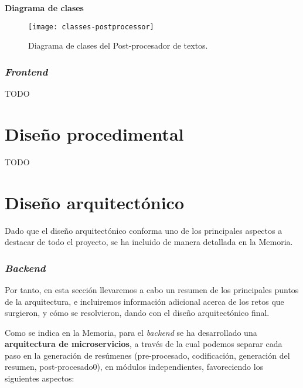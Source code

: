 \noindent
\textbf{Diagrama de clases}

\begin{figure}[h]
	\centering
	\texttt{[image: classes-postprocessor]}
	\vspace{-0.5cm}
	\caption{Diagrama de clases del Post-procesador de textos.}
\end{figure}


\subsubsection{\Large \emph{Frontend}}

TODO

\section{Diseño procedimental}

TODO

\section{Diseño arquitectónico}

Dado que el diseño arquitectónico conforma uno de los principales aspectos a destacar de todo el proyecto, se ha incluido de manera detallada en la Memoria.

\subsubsection{\Large \emph{Backend}}

Por tanto, en esta sección llevaremos a cabo un resumen de los principales puntos de la arquitectura, e incluiremos información adicional acerca de los retos que surgieron, y cómo se resolvieron, dando con el diseño arquitectónico final.

Como se indica en la Memoria, para el \emph{backend} se ha desarrollado una \textbf{arquitectura de microservicios}, a través de la cual podemos separar cada paso en la generación de resúmenes (pre-procesado, codificación, generación del resumen, post-procesado0), en módulos independientes, favoreciendo los siguientes aspectos:

